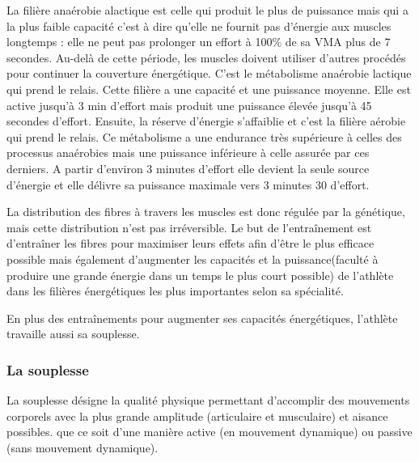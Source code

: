          La filière anaérobie alactique est celle qui produit le plus de puissance mais qui a la plus faible capacité c'est à dire qu'elle ne fournit pas d'énergie aux muscles longtemps : elle ne peut pas prolonger un effort à 100\% de sa VMA plus de 7 secondes. Au-delà de cette période, les muscles doivent utiliser d’autres procédés pour continuer la couverture énergétique. C'est le métabolisme anaérobie lactique qui prend le relais. Cette filière a une capacité et une puissance moyenne. Elle est active jusqu'à 3 min d'effort mais produit une puissance élevée jusqu'à 45 secondes d'effort. Ensuite, la réserve d'énergie s'affaiblie et c'est la filière aérobie qui prend le relais. Ce métabolisme a une endurance très supérieure à celles des processus anaérobies mais une puissance inférieure à celle assurée par ces derniers. A partir d'environ 3 minutes d'effort elle devient la seule source d'énergie et elle délivre sa puissance maximale vers 3 minutes 30 d'effort.
         
         
         \vspace{10pt}
        
        La distribution des fibres à travers les muscles est donc régulée par la génétique, mais cette distribution n'est pas irréversible.  
        Le but de l'entraînement est d'entraîner les fibres pour maximiser leurs effets afin d'être le plus efficace possible mais également d'augmenter les capacités et la puissance(faculté à produire une grande énergie dans un temps le plus court possible) de l'athlète dans les filières énergétiques les plus importantes selon sa spécialité. 
        
        
        En plus des entraînements pour augmenter ses capacités énergétiques, l'athlète travaille aussi sa souplesse.
                
            
        \subsubsection{La souplesse}
        La souplesse désigne la qualité physique permettant d’accomplir des mouvements corporels avec la plus grande amplitude (articulaire et musculaire) et aisance possibles. que ce soit d’une manière active (en mouvement dynamique) ou passive (sans mouvement dynamique).
    
